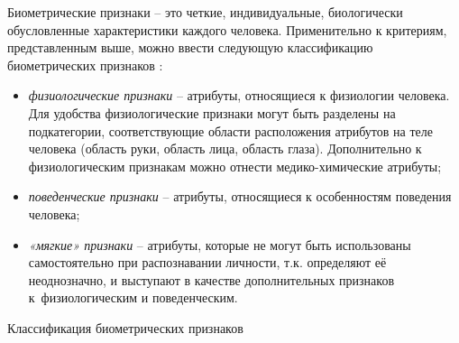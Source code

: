 \documentclass[12pt]{book}
\begin{document}
\large{Биометрические признаки -- это четкие, индивидуальные, биологически обусловленные характеристики каждого человека. Применительно к критериям, представленным выше, можно ввести следующую классификацию биометрических признаков \cite{unar_2014}:

\begin{itemize}[topsep=1pt] \itemsep0.1em
\item \textit{физиологические признаки} -- атрибуты, относящиеся к физиологии человека. Для удобства физиологические признаки могут быть разделены на подкатегории, соответствующие области расположения атрибутов на теле человека (область руки, область лица, область глаза). Дополнительно к физиологическим признакам можно отнести медико-химические атрибуты;
\item \textit{поведенческие признаки} -- атрибуты, относящиеся к особенностям поведения человека;
\item \textit{«мягкие» признаки} -- атрибуты, которые не могут быть использованы самостоятельно при распознавании личности, т.к. определяют её неоднозначно, и выступают в качестве дополнительных признаков к~физиологическим и поведенческим.
\end{itemize}

\begin{table}[h]
\centering
\caption{\label{tab:table_1_1}Классификация биометрических признаков}


\end{table}}
\end{document}
